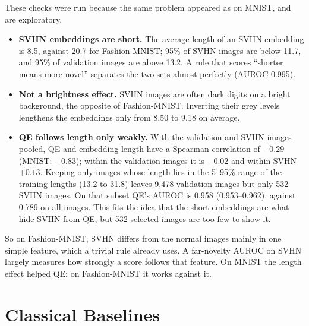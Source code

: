 \documentclass[11pt]{article}
\begin{document}
These checks were run because the same problem appeared as on MNIST, and are exploratory.
\begin{itemize}[leftmargin=1.4em, itemsep=2pt]
\item \textbf{SVHN embeddings are short.} The average length of an SVHN embedding is 8.5, against 20.7 for Fashion-MNIST; 95\% of SVHN images are below 11.7, and 95\% of validation images are above 13.2. A rule that scores ``shorter means more novel'' separates the two sets almost perfectly (AUROC 0.995).
\item \textbf{Not a brightness effect.} SVHN images are often dark digits on a bright background, the opposite of Fashion-MNIST. Inverting their grey levels lengthens the embeddings only from 8.50 to 9.18 on average.
\item \textbf{QE follows length only weakly.} With the validation and SVHN images pooled, QE and embedding length have a Spearman correlation of $-0.29$ (MNIST: $-0.83$); within the validation images it is $-0.02$ and within SVHN $+0.13$. Keeping only images whose length lies in the 5--95\% range of the training lengths (13.2 to 31.8) leaves 9,478 validation images but only 532 SVHN images. On that subset QE's AUROC is 0.958 (0.953--0.962), against 0.789 on all images. This fits the idea that the short embeddings are what hide SVHN from QE, but 532 selected images are too few to show it.
\end{itemize}
So on Fashion-MNIST, SVHN differs from the normal images mainly in one simple feature, which a trivial rule already uses. A far-novelty AUROC on SVHN largely measures how strongly a score follows that feature. On MNIST the length effect helped QE; on Fashion-MNIST it works against it.

\section{Classical Baselines}\label{sec:baselines}
\end{document}
